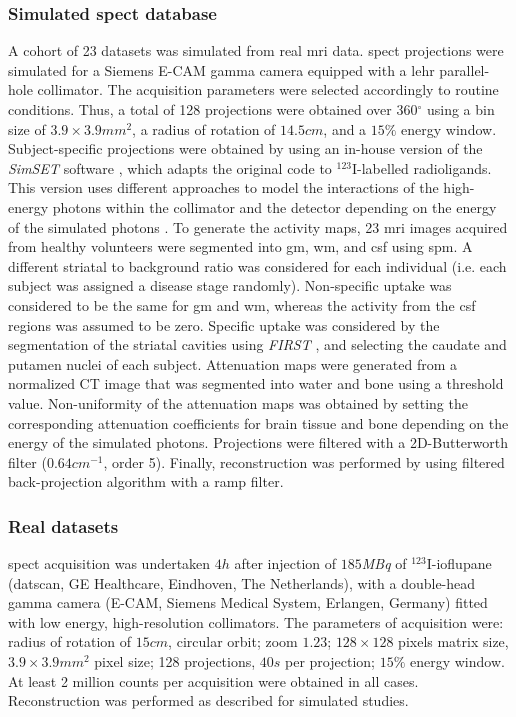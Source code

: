 \documentclass{frontiers}
\newcommand{\degree}{\ensuremath{^{\circ}}}
\begin{document}
\subsubsection{Simulated \gls*{spect} database} %
\label{sec:data_simulated}
A cohort of 23 datasets was simulated from real \gls*{mri} data.
  \Gls*{spect} projections were simulated  for a Siemens E-CAM gamma
  camera equipped with a \acrlong*{lehr} parallel-hole collimator.
The acquisition parameters were selected accordingly to routine conditions.
Thus, a total of 128 projections were obtained over 360{\degree} using a
  bin size of $3.9\times3.9mm^{2}$, a radius of rotation of $14.5cm$, and
  a $15\%$ energy window.
Subject-specific projections were obtained by using an in-house version
  \citep{crespo_quantification_2008} of the \emph{SimSET} software
  \citep{harrison_preliminary_1993}, which adapts the original code
  to $^{123}$I-labelled radioligands.
This version uses different approaches to model the interactions of
  the high-energy photons within the collimator and the detector depending
  on the energy of the simulated photons 
  \citep{cot_study_2004, cot_modeling_2006}.
To generate the activity maps, 23 \gls*{mri} images acquired from healthy
  volunteers were segmented into \gls*{gm}, \gls*{wm}, and \gls*{csf}
  using \gls*{spm}.
A different striatal to background ratio was considered for each individual
  (i.e. each subject was assigned a disease stage randomly).
Non-specific uptake was considered to be the same for \gls*{gm} and \gls*{wm},
  whereas the activity from the \gls*{csf} regions was assumed to be zero.
Specific uptake was considered by the segmentation of the striatal cavities
  using \emph{FIRST} \citep{patenaude_bayesian_2011},
  and selecting the caudate and putamen nuclei of each subject.
Attenuation maps were generated from a normalized CT image that was
  segmented into water and bone using a threshold value.
Non-uniformity of the attenuation maps was obtained by setting the
  corresponding attenuation coefficients for brain tissue and bone
  depending on the energy of the simulated photons.
Projections were filtered with a 2D-Butterworth filter ($0.64cm^{-1}$,
  order 5). Finally, reconstruction was performed by using filtered 
  back-projection algorithm with a ramp filter.


\subsubsection{Real datasets} %
\label{sec:data_real}
\Gls*{spect} acquisition was undertaken $4h$
  after injection  of $185$\textit{MBq} of $^{123}$I-ioflupane
  (\Gls*{datscan}, GE Healthcare, Eindhoven, The Netherlands),
  with a  double-head gamma camera (E-CAM, Siemens Medical System,
  Erlangen, Germany) fitted with low energy, high-resolution collimators.
The parameters of acquisition were: radius of rotation of $15cm$,
  circular orbit; zoom $1.23$; $128\times128$
  pixels matrix size, $3.9\times3.9mm^{2}$ pixel size;
  128 projections, $40s$ per projection; 
  $15\%$ energy window.
At least 2 million counts per acquisition were obtained in all cases.
Reconstruction was performed as described for simulated studies.
\end{document}

